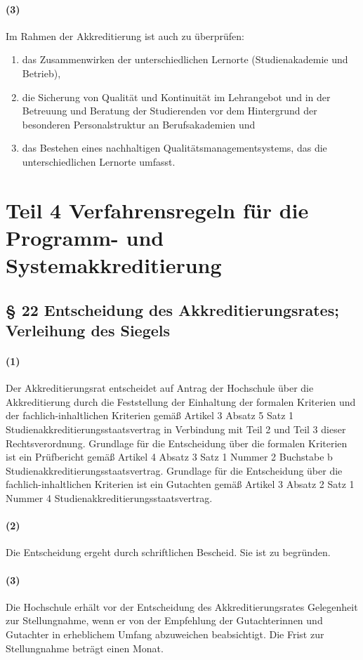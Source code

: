 \documentclass[a4paper]{scrartcl}
\begin{document}
\paragraph{(3)} Im Rahmen der Akkreditierung ist auch zu überprüfen:
\begin{enumerate}
\item das Zusammenwirken der unterschiedlichen Lernorte (Studienakademie und Betrieb),
\item die Sicherung von Qualität und Kontinuität im Lehrangebot und in der Betreuung und Beratung der Studierenden vor dem Hintergrund der
besonderen Personalstruktur an Berufsakademien und
\item das Bestehen eines nachhaltigen Qualitätsmanagementsystems, das die unterschiedlichen Lernorte umfasst.
\end{enumerate}





\section{Teil 4 Verfahrensregeln für die Programm- und Systemakkreditierung}


\subsection{§ 22 Entscheidung des Akkreditierungsrates; Verleihung des Siegels}
\paragraph{(1)} Der Akkreditierungsrat entscheidet auf Antrag der Hochschule über die Akkreditierung durch die Feststellung der Einhaltung der formalen Kriterien und der fachlich-inhaltlichen Kriterien gemäß Artikel 3 Absatz 5 Satz 1 Studienakkreditierungsstaatsvertrag in Verbindung mit Teil 2 und Teil 3 dieser Rechtsverordnung. Grundlage für die Entscheidung über die formalen Kriterien ist ein Prüfbericht gemäß Artikel 4 Absatz 3 Satz 1 Nummer 2 Buchstabe b Studienakkreditierungsstaatsvertrag. Grundlage für die Entscheidung über die fachlich-inhaltlichen Kriterien ist ein Gutachten gemäß Artikel 3 Absatz 2 Satz 1 Nummer 4 Studienakkreditierungsstaatsvertrag.
\paragraph{(2)} Die Entscheidung ergeht durch schriftlichen Bescheid. Sie ist zu begründen.
\paragraph{(3)} Die Hochschule erhält vor der Entscheidung des Akkreditierungsrates Gelegenheit zur Stellungnahme, wenn er von der Empfehlung der Gutachterinnen und Gutachter in erheblichem Umfang abzuweichen beabsichtigt. Die Frist zur Stellungnahme beträgt einen Monat.
\end{document}
